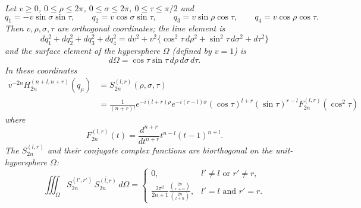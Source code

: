 \emph{Let $v\ge0$, $0\le\rho\le2\pi$, $0\le\sigma\le2\pi$, $0\le\tau\le\pi/2$ and}
\begin{equation}\tag{142}
q_1=-v\sin\sigma\sin\tau,\qquad q_2=v\cos\sigma\sin\tau,
\qquad q_3=v\sin\rho\cos\tau,\qquad q_4=v\cos\rho\cos\tau.
\end{equation}
\emph{Then $v,\rho,\sigma,\tau$ are orthogonal coordinates; the line element is}
\begin{equation}\tag{143}
dq_1^2+dq_2^2+dq_3^2+dq_4^2
=dv^2+v^2\{\cos^2\tau\,d\rho^2+\sin^2\tau\,d\sigma^2+d\tau^2\}
\end{equation}
\emph{and the surface element of the hypersphere $\Omega$ (defined by $v=1$) is}
\begin{equation}\tag{144}
d\Omega=\cos\tau\sin\tau\,d\rho\,d\sigma\,d\tau.
\end{equation}
\emph{In these coordinates}
\begin{equation}\tag{145}
\begin{aligned}
v^{-2n}H_{2n}^{(n+l,n+r)}(q_\mu)
&=S_{2n}^{(l,r)}(\rho,\sigma,\tau)\\
&=\frac1{(n+r)!}e^{-i(l+r)\rho}e^{-i(r-l)\sigma}
(\cos\tau)^{l+r}(\sin\tau)^{r-l}F_{2n}^{(l,r)}(\cos^2\tau)
\end{aligned}
\end{equation}
\emph{where}
\begin{equation}\tag{146}
F_{2n}^{(l,r)}(t)=\frac{d^{n+r}}{dt^{n+r}}t^{n-l}(t-1)^{n+l}.
\end{equation}
\emph{The $S_{2n}^{(l,r)}$ and their conjugate complex functions are biorthogonal on the unit-hypersphere $\Omega$:}
\begin{equation}\tag{147}
\iiint_\Omega S_{2n}^{(l',r')}\,\overline{S_{2n}^{(l,r)}}\,d\Omega
=\begin{cases}
0,&l'\ne l\text{ or }r'\ne r,\\[4pt]
\displaystyle \frac{2\pi^2}{2n+1}\frac{\binom{2n}{r+n}}{\binom{2n}{l+n}},&l'=l\text{ and }r'=r.
\end{cases}
\end{equation}

